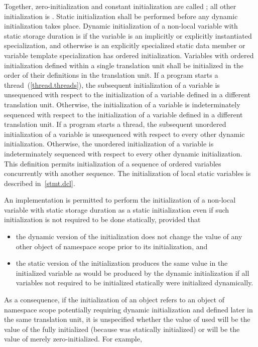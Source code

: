 Together, zero-initialization and constant initialization are called ; all other initialization is . Static
initialization shall be performed before any dynamic initialization takes place. Dynamic
initialization of a non-local variable with static storage duration is 
 if the variable is an implicitly or explicitly instantiated
specialization, and otherwise is  \enternote an explicitly
specialized static data member or variable template specialization has
ordered initialization. \exitnote Variables with ordered
initialization defined within a single translation unit shall be initialized in the order of
their definitions in the translation unit. If a program starts a thread~(\ref{thread.threads}),
the subsequent initialization of a variable is unsequenced with respect to the initialization
of a variable defined in a different translation unit. Otherwise, the initialization of a
variable is indeterminately sequenced with respect to the initialization of a variable defined
in a different translation unit. If a program starts a thread, the subsequent unordered
initialization of a variable is unsequenced with respect to every other dynamic initialization.
Otherwise, the unordered initialization of a variable is indeterminately sequenced with respect
to every other dynamic initialization. \enternote This definition permits initialization of a
sequence of ordered variables concurrently with another sequence. \exitnote \enternote The
initialization of local static variables is described in~\ref{stmt.dcl}. \exitnote

\pnum
An implementation is permitted to perform the initialization of a
non-local variable with static storage duration as a static
initialization even if such initialization is not required to be done
statically, provided that

\begin{itemize}
\item
the dynamic version of the initialization does not change the
value of any other object of namespace scope prior to its initialization, and

\item
the static version of the initialization produces the same value
in the initialized variable as would be produced by the dynamic
initialization if all variables not required to be initialized statically
were initialized dynamically.
\end{itemize}

\enternote As a consequence, if the initialization of an object  refers to an
object  of namespace scope potentially requiring dynamic initialization and defined
later in the same translation unit, it is unspecified whether the value of  used
will be the value of the fully initialized  (because  was statically
initialized) or will be the value of  merely zero-initialized. For example,

